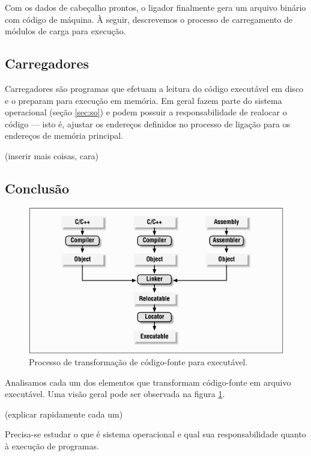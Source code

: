 Com os dados de cabeçalho prontos, o ligador finalmente gera um arquivo binário
com código de máquina. À seguir, descrevemos o processo de carregamento de
módulos de carga para execução.

\subsection{Carregadores}

Carregadores são programas que efetuam a leitura do código executável em disco e
o preparam para execução em memória. Em geral fazem parte do sistema operacional
(seção \ref{sec:so}) e podem possuir a responsabilidade de realocar o código ---
isto é, ajustar os endereços definidos no processo de ligação para os endereços
de memória principal.

(inserir mais coisas, cara)

\subsection{Conclusão}

\begin{figure}[ptb]
  \begin{center}
    \includegraphics[scale=.6]{imagens/1_software_basico}
  \end{center}
  \caption{Processo de transformação de código-fonte para executável.}
  \label{software_basico}
\end{figure}

Analisamos cada um dos elementos que transformam código-fonte em arquivo
executável. Uma visão geral pode ser observada na figura \ref{software_basico}.

(explicar rapidamente cada um)

Precisa-se estudar o que é sistema operacional e qual sua responsabilidade
quanto à execução de programas.

